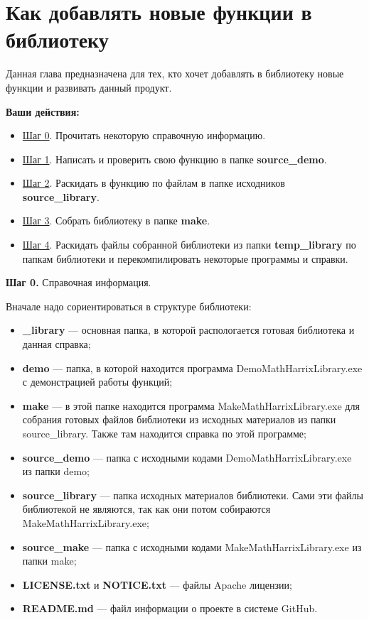 \newpage
\section{Как добавлять новые функции в библиотеку}\label{section_addnew}

Данная глава предназначена для тех, кто хочет добавлять в библиотеку новые функции и развивать данный продукт.

\textbf{Ваши действия:}

\begin{itemize}
\item \hyperref[step0]{Шаг 0}. Прочитать некоторую справочную информацию.
\item \hyperref[step1]{Шаг 1}. Написать и проверить свою функцию в папке \textbf{source\_demo}.
\item \hyperref[step2]{Шаг 2}. Раскидать в функцию по файлам в папке исходников \textbf{source\_library}.
\item \hyperref[step3]{Шаг 3}. Собрать библиотеку в папке \textbf{make}.
\item \hyperref[step4]{Шаг 4}. Раскидать файлы собранной библиотеки из папки \textbf{temp\_library} по папкам библиотеки и перекомпилировать некоторые программы и справки.
\end{itemize}

\textbf{Шаг 0.} \label{step0} Справочная информация.

Вначале надо сориентироваться в структуре библиотеки:
\begin{itemize}
\item \textbf{\_library} --- основная папка, в которой распологается готовая библиотека и данная справка;
\item \textbf{demo} --- папка, в которой находится программа DemoMathHarrixLibrary.exe с демонстрацией работы функций;
\item \textbf{make} --- в этой папке находится программа MakeMathHarrixLibrary.exe для собрания готовых файлов библиотеки из исходных материалов из папки source\_library. Также там находится справка по этой программе;
\item \textbf{source\_demo} --- папка с исходными кодами DemoMathHarrixLibrary.exe из папки demo;
\item \textbf{source\_library} --- папка исходных материалов библиотеки. Сами эти файлы библиотекой не являются, так как они потом собираются MakeMathHarrixLibrary.exe; 
\item \textbf{source\_make} --- папка с исходными кодами MakeMathHarrixLibrary.exe из папки make;
\item \textbf{LICENSE.txt} и \textbf{NOTICE.txt} --- файлы Apache лицензии;
\item \textbf{README.md} --- файл информации о проекте в системе GitHub.
\end{itemize}

